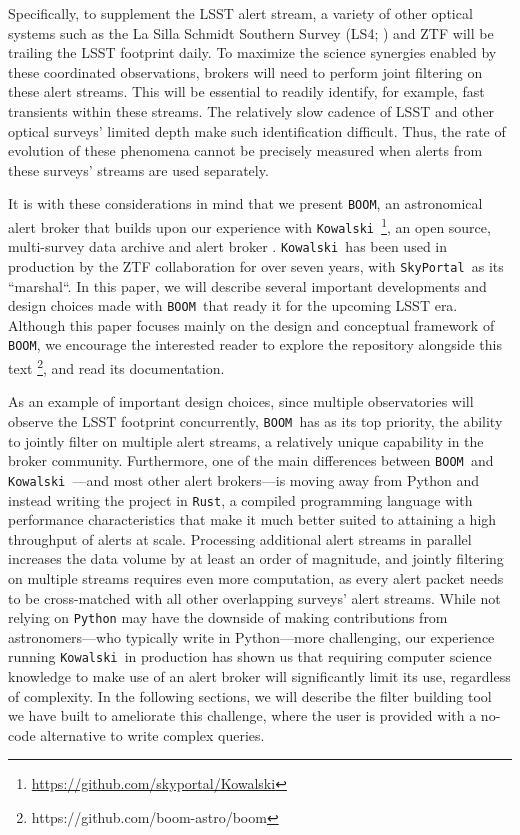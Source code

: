 \documentclass[twocolumn]{aastex631}
\newcommand{\boom}{\texttt{BOOM }}
\newcommand{\kowalski}{\texttt{Kowalski }}
\newcommand{\skyportal}{\texttt{SkyPortal }}
\begin{document}
Specifically, to supplement the LSST alert stream, a variety of other optical systems such as the La Silla Schmidt Southern Survey (LS4; \citealt{miller2025lasillaschmidtsouthern}) and ZTF will be trailing the LSST footprint daily. To maximize the science synergies enabled by these coordinated observations, brokers will need to perform joint filtering on these alert streams.
This will be essential to readily identify, for example, fast transients within these streams.
The relatively slow cadence of LSST and other optical surveys' limited depth make such identification difficult. Thus, the rate of evolution of these phenomena cannot be precisely measured when alerts from these surveys' streams are used separately.

It is with these considerations in mind that we present \texttt{BOOM}, an astronomical alert broker that builds upon our experience with \kowalski\footnote{\url{https://github.com/skyportal/Kowalski}}, an open source, multi-survey data archive and alert broker \citep{DuMa2019}. \kowalski has been used in production by the ZTF collaboration for over seven years, with \skyportal as its ``marshal``.
In this paper, we will describe several important developments and design choices made with \boom that ready it for the upcoming LSST era.
Although this paper focuses mainly on the design and conceptual framework of \texttt{BOOM}, we encourage the interested reader to explore the repository alongside this text \footnote{https://github.com/boom-astro/boom}, and read its documentation.

As an example of important design choices,
since multiple observatories will observe the LSST footprint concurrently,
\boom has as its top priority,
the ability to jointly filter on multiple alert streams,
a relatively unique capability in the broker community.
Furthermore, one of the main differences between
\boom and \kowalski---and most other alert brokers---is moving away from
Python and instead writing the project in \texttt{Rust},
a compiled programming language with performance characteristics that make
it much better suited to attaining a high throughput of alerts at scale.
Processing additional alert streams in parallel increases the data volume
by at least an order of magnitude,
and jointly filtering on multiple streams requires even more computation,
as every alert packet needs to be cross-matched with all other
overlapping surveys' alert streams.
While not relying on \texttt{Python}
may have the downside of making contributions from astronomers---who
typically write in Python---more challenging,
our experience running \kowalski in production has shown us that requiring
computer science knowledge to make use of an alert broker will significantly
limit its use, regardless of complexity. In the following sections,
we will describe the filter building tool we have built to ameliorate this
challenge, where the user is provided with a no-code alternative to write
complex queries.
\end{document}
